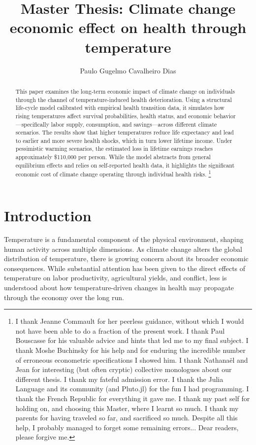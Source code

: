 \documentclass{article}
\author{Paulo Gugelmo Cavalheiro Dias}
\title{Master Thesis: Climate change economic effect on health through temperature}
\begin{document}
\maketitle

\begin{abstract}
    This paper examines the long-term economic impact of climate change on individuals through the channel of temperature-induced health deterioration. Using a structural life-cycle model calibrated with empirical health transition data, it simulates how rising temperatures affect survival probabilities, health status, and economic behavior—specifically labor supply, consumption, and savings—across different climate scenarios. The results show that higher temperatures reduce life expectancy and lead to earlier and more severe health shocks, which in turn lower lifetime income. Under pessimistic warming scenarios, the estimated loss in lifetime earnings reaches approximately \$110,000 per person. While the model abstracts from general equilibrium effects and relies on self-reported health data, it highlights the significant economic cost of climate change operating through individual health risks.
    \footnote{
    I thank Jeanne Commault for her peerless guidance, without which I would not have been able to do a fraction of the present work. 
    I thank Paul Bouscasse for his valuable advice and hints that led me to my final subject.
    I thank Moshe Buchinsky for his help and for enduring the incredible number of erroneous econometric specifications I showed him.
    I thank Nathanaël and Jean for interesting (but often cryptic) collective monologues about our different thesis.
    I thank my fateful admission error.
    I thank the Julia Language and its community (and Pluto.jl) for the fun I had programming.
    I thank the French Republic for everything it gave me.
    I thank my past self for holding on, and choosing this Master, where I learnt so much.
    I thank my parents for having traveled so far, and sacrificed so much.
    Despite all this help, I probably managed to forget some remaining errors...
    Dear readers, please forgive me.}
\end{abstract}

\newpage
\tableofcontents

\newpage
\section{Introduction}
Temperature is a fundamental component of the
physical environment, shaping human activity
across multiple dimensions. As climate change
alters the global distribution of temperature,
there is growing concern about its broader
economic consequences. While substantial
attention has been given to the direct effects
of temperature on labor productivity,
agricultural yields, and conflict, less
is understood about how temperature-driven
changes in health may propagate through the
economy over the long run.
\end{document}
